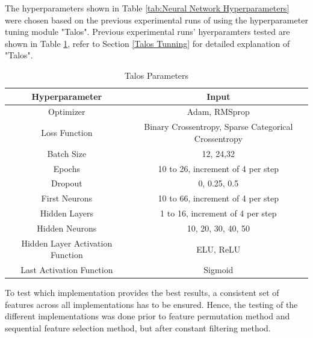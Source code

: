 \documentclass{tum-book}
\begin{document}
        \noindent
        The hyperparameters shown in Table \ref{tab:Neural Network Hyperparameters} were chosen based on the previous experimental runs of using the hyperparameter tuning module "Talos"\cite{Talos}. Previous experimental runs' hyerparamters tested are shown in Table \ref{tab:Talos Parameters}, refer to Section \ref{Talos Tunning} for detailed explanation of "Talos". 
        
                \begin{table}[ht]
                \centering
                \begin{tabular}{|c|c|}
                \hline
                Hyperparameter & Input\\
                \hline
                \hline
                Optimizer & Adam, RMSprop  \\
                \hline
                Loss Function & Binary Crossentropy, Sparse Categorical Crossentropy  \\
                \hline
                Batch Size & 12, 24,32\\
                \hline
                Epochs & 10 to 26, increment of 4 per step\\
                \hline
                Dropout & 0, 0.25, 0.5 \\
                \hline
                First Neurons & 10 to 66, increment of 4 per step  \\
                \hline
                Hidden Layers & 1 to 16, increment of 4 per step  \\
                \hline
                Hidden Neurons & 10, 20, 30, 40, 50  \\
                \hline
                Hidden Layer Activation Function & ELU, ReLU\\
                \hline
                Last Activation Function & Sigmoid\\
                \hline
                \end{tabular}
                \caption{Talos Parameters}
                \label{tab:Talos Parameters}
            \end{table}
        \noindent
        
        \bigskip\noindent
        To test which implementation provides the best results, a consistent set of features across all implementations has to be ensured. Hence, the testing of the different implementations was done prior to feature permutation method and sequential feature selection method, but after constant filtering method.
        
\end{document}
